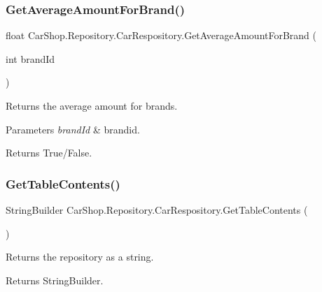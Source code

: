 \subsubsection{\texorpdfstring{Get\+Average\+Amount\+For\+Brand()}{GetAverageAmountForBrand()}}
{\footnotesize\ttfamily float Car\+Shop.\+Repository.\+Car\+Respository.\+Get\+Average\+Amount\+For\+Brand (\begin{DoxyParamCaption}\item[{int}]{brand\+Id }\end{DoxyParamCaption})}



Returns the average amount for brands. 


\begin{DoxyParams}{Parameters}
{\em brand\+Id} & brandid.\\
\hline
\end{DoxyParams}
\begin{DoxyReturn}{Returns}
True/\+False.
\end{DoxyReturn}
\mbox{\label{class_car_shop_1_1_repository_1_1_car_respository_a813570f301ee59cfda45a893be49a663}} 
\subsubsection{\texorpdfstring{Get\+Table\+Contents()}{GetTableContents()}}
{\footnotesize\ttfamily String\+Builder Car\+Shop.\+Repository.\+Car\+Respository.\+Get\+Table\+Contents (\begin{DoxyParamCaption}{ }\end{DoxyParamCaption})}



Returns the repository as a string. 

\begin{DoxyReturn}{Returns}
String\+Builder.
\end{DoxyReturn}
\mbox{\label{class_car_shop_1_1_repository_1_1_car_respository_aa4c68a6789697071168f24a158091140}} 
